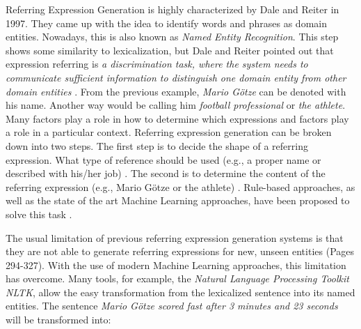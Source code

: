 Referring Expression Generation is highly characterized by Dale and Reiter in 1997. They came up with the idea to identify words and phrases as domain entities. Nowadays, this is also known as \textit{Named Entity Recognition}. This step shows some similarity to lexicalization, but Dale and Reiter pointed out that expression referring is \textit{a discrimination task, where the system needs to communicate sufficient information to distinguish one domain entity from other domain entities} \cite{reiter2}. From the previous example, \textit{Mario Götze} can be denoted with his name. Another way would be calling him \textit{football professional} or \textit{the athlete}. Many factors play a role in how to determine which expressions and factors play a role in a particular context. Referring expression generation can be broken down into two steps.
The first step is to decide the shape of a referring expression. What type of reference should be used (e.g., a proper name or described with his/her job) \cite{named}. The second is to determine the content of the referring expression (e.g., Mario Götze or the athlete) \cite{named}.
Rule-based approaches, as well as the state of the art Machine Learning approaches, have been proposed to solve this task \cite{reiter2}.  

The usual limitation of previous referring expression generation systems is that they are not able to generate referring expressions for new, unseen entities \cite{anja} (Pages 294-327). With the use of modern Machine Learning approaches, this limitation has overcome.
Many tools, for example, the \textit{Natural Language Processing Toolkit NLTK}, allow the easy transformation from the lexicalized sentence into its named entities. The sentence \textit{Mario Götze scored fast after 3 minutes and 23 seconds} will be transformed into:

